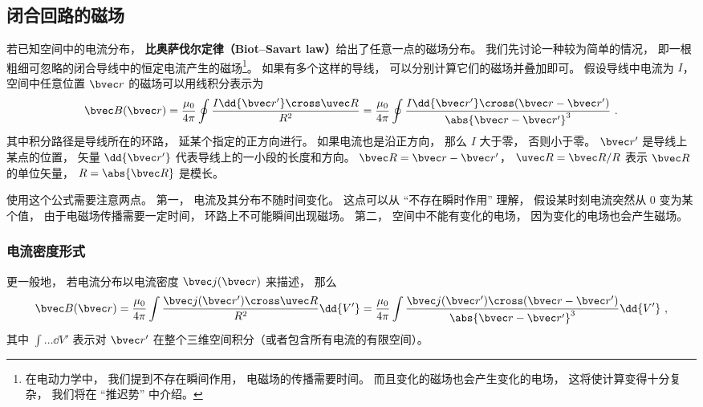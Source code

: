 
\subsection{闭合回路的磁场}
若已知空间中的电流分布， \textbf{比奥萨伐尔定律（Biot–Savart law）}给出了任意一点的磁场分布。 我们先讨论一种较为简单的情况， 即一根粗细可忽略的闭合导线中的恒定电流产生的磁场\footnote{在电动力学中， 我们提到不存在瞬间作用， 电磁场的传播需要时间。 而且变化的磁场也会产生变化的电场， 这将使计算变得十分复杂， 我们将在 “推迟势” 中介绍。}。 如果有多个这样的导线， 可以分别计算它们的磁场并叠加即可。 假设导线中电流为 $I$， 空间中任意位置 $\bvec r$ 的磁场可以用线积分表示为
\begin{equation}\label{BioSav_eq2}
\bvec B(\bvec r) = \frac{\mu_0}{4\pi} \oint \frac{I \dd{\bvec r'} \cross \uvec R}{R^2}
= \frac{\mu_0}{4\pi} \oint \frac{I \dd{\bvec r'} \cross (\bvec r - \bvec r')}{\abs{\bvec r - \bvec r'}^3}~.
\end{equation}
其中积分路径是导线所在的环路， 延某个指定的正方向进行。 如果电流也是沿正方向， 那么 $I$ 大于零， 否则小于零。 $\bvec r'$ 是导线上某点的位置， 矢量 $\dd{\bvec r'}$ 代表导线上的一小段的长度和方向。 $\bvec R = \bvec r - \bvec r'$， $\uvec R = \bvec R/R$ 表示 $\bvec R$ 的单位矢量， $R = \abs{\bvec R}$ 是模长。

使用这个公式需要注意两点。 第一， 电流及其分布不随时间变化。 这点可以从 “不存在瞬时作用” 理解， 假设某时刻电流突然从 0 变为某个值， 由于电磁场传播需要一定时间， 环路上不可能瞬间出现磁场。 第二， 空间中不能有变化的电场， 因为变化的电场也会产生磁场。%

\subsubsection{电流密度形式}
更一般地， 若电流分布以电流密度 $\bvec j(\bvec r)$ 来描述， 那么
\begin{equation}\label{BioSav_eq3}
\bvec B(\bvec r) = \frac{\mu_0}{4\pi} \int \frac{\bvec j(\bvec r') \cross \uvec R}{R^2} \dd{V'} = \frac{\mu_0}{4\pi} \int \frac{\bvec j(\bvec r') \cross (\bvec r - \bvec r')}{\abs{\bvec r - \bvec r'}^3} \dd{V'}~,
\end{equation}
其中 $\int \dots \dd{V'}$ 表示对 $\bvec r'$ 在整个三维空间积分（或者包含所有电流的有限空间）。

